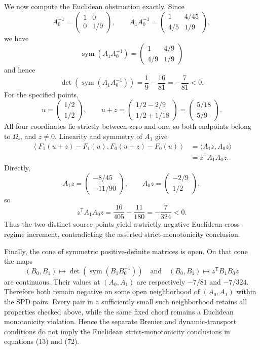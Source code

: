 We now compute the Euclidean obstruction exactly.  Since
\[
A_0^{-1}=\begin{pmatrix}1&0\\0&1/9\end{pmatrix},
\qquad
A_1A_0^{-1}
=\begin{pmatrix}1&4/45\\4/5&1/9\end{pmatrix},
\]
we have
\[
\operatorname{sym}(A_1A_0^{-1})
=\begin{pmatrix}1&4/9\\4/9&1/9\end{pmatrix}
\]
and hence
\[
\det\!\left(\operatorname{sym}(A_1A_0^{-1})\right)
=\frac19-\frac{16}{81}=-\frac7{81}<0.
\]
For the specified points,
\[
u=\begin{pmatrix}1/2\\1/2\end{pmatrix},
\qquad
u+z=\begin{pmatrix}1/2-2/9\\1/2+1/18\end{pmatrix}
=\begin{pmatrix}5/18\\5/9\end{pmatrix}.
\]
All four coordinates lie strictly between zero and one, so both endpoints belong to \(\Omega_{\square}\), and \(z\ne0\).  Linearity and symmetry of \(A_1\) give
\[
\begin{aligned}
\left\langle F_1(u+z)-F_1(u),F_0(u+z)-F_0(u)\right\rangle
&=\langle A_1z,A_0z\rangle\\
&=z^{\mathsf T}A_1A_0z.
\end{aligned}
\]
Directly,
\[
A_1z=\begin{pmatrix}-8/45\\-11/90\end{pmatrix},
\qquad
A_0z=\begin{pmatrix}-2/9\\1/2\end{pmatrix},
\]
so
\[
z^{\mathsf T}A_1A_0z
=\frac{16}{405}-\frac{11}{180}
=-\frac7{324}<0.
\]
Thus the two distinct source points yield a strictly negative Euclidean cross-regime increment, contradicting the asserted strict-monotonicity conclusion.

Finally, the cone of symmetric positive-definite matrices is open.  On that cone the maps
\[
(B_0,B_1)\longmapsto
\det\!\left(\operatorname{sym}(B_1B_0^{-1})\right)
\quad\text{and}\quad
(B_0,B_1)\longmapsto z^{\mathsf T}B_1B_0z
\]
are continuous.  Their values at \((A_0,A_1)\) are respectively \(-7/81\) and \(-7/324\).  Therefore both remain negative on some open neighborhood of \((A_0,A_1)\) within the SPD pairs.  Every pair in a sufficiently small such neighborhood retains all properties checked above, while the same fixed chord remains a Euclidean monotonicity violation.  Hence the separate Brenier and dynamic-transport conditions do not imply the Euclidean strict-monotonicity conclusions in equations (13) and (72).
